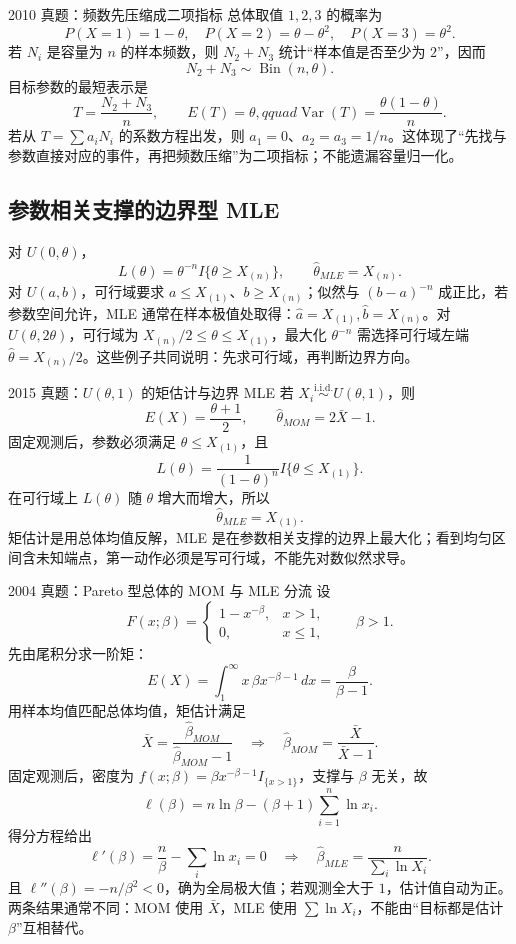 \documentclass[11pt,a4paper]{ctexart}
\begin{document}
\begin{examplebox}{2010 真题：频数先压缩成二项指标}
总体取值 $1,2,3$ 的概率为
\[
P(X=1)=1-\theta,\quad P(X=2)=\theta-\theta^2,\quad P(X=3)=\theta^2.
\]
若 $N_i$ 是容量为 $n$ 的样本频数，则 $N_2+N_3$ 统计“样本值是否至少为 $2$”，因而
\[
N_2+N_3\sim\operatorname{Bin}(n,\theta).
\]
目标参数的最短表示是
\[
T=\frac{N_2+N_3}{n},\qquad E(T)=\theta,qquad
\operatorname{Var}(T)=\frac{\theta(1-\theta)}n.
\]
若从 $T=\sum a_iN_i$ 的系数方程出发，则 $a_1=0$、$a_2=a_3=1/n$。这体现了“先找与参数直接对应的事件，再把频数压缩”为二项指标；不能遗漏容量归一化。
\end{examplebox}

\subsection{参数相关支撑的边界型 MLE}

对 $U(0,\theta)$，
\[
L(\theta)=\theta^{-n}I\{\theta\ge X_{(n)}\},\qquad \widehat\theta_{MLE}=X_{(n)}.
\]
对 $U(a,b)$，可行域要求 $a\le X_{(1)}$、$b\ge X_{(n)}$；似然与 $(b-a)^{-n}$ 成正比，若参数空间允许，MLE 通常在样本极值处取得：$\widehat a=X_{(1)},\widehat b=X_{(n)}$。对 $U(\theta,2\theta)$，可行域为 $X_{(n)}/2\le\theta\le X_{(1)}$，最大化 $\theta^{-n}$ 需选择可行域左端 $\widehat\theta=X_{(n)}/2$。这些例子共同说明：先求可行域，再判断边界方向。

\begin{examplebox}{2015 真题：$U(\theta,1)$ 的矩估计与边界 MLE}
若 $X_i\overset{\mathrm{i.i.d.}}\sim U(\theta,1)$，则
\[
E(X)=\frac{\theta+1}{2},\qquad \widehat\theta_{MOM}=2\bar X-1.
\]
固定观测后，参数必须满足 $\theta\le X_{(1)}$，且
\[
L(\theta)=\frac{1}{(1-\theta)^n}I\{\theta\le X_{(1)}\}.
\]
在可行域上 $L(\theta)$ 随 $\theta$ 增大而增大，所以
\[
\widehat\theta_{MLE}=X_{(1)}.
\]
矩估计是用总体均值反解，MLE 是在参数相关支撑的边界上最大化；看到均匀区间含未知端点，第一动作必须是写可行域，不能先对数似然求导。
\end{examplebox}

\begin{examplebox}{2004 真题：Pareto 型总体的 MOM 与 MLE 分流}
设
\[
F(x;\beta)=\begin{cases}1-x^{-\beta},&x>1,\\0,&x\le1,\end{cases}
\qquad \beta>1.
\]
先由尾积分求一阶矩：
\[
E(X)=\int_1^\infty x\,\beta x^{-\beta-1}\,dx
=\frac{\beta}{\beta-1}.
\]
用样本均值匹配总体均值，矩估计满足
\[
\bar X=\frac{\widehat\beta_{MOM}}{\widehat\beta_{MOM}-1}
\quad\Longrightarrow\quad
\widehat\beta_{MOM}=\frac{\bar X}{\bar X-1}.
\]
固定观测后，密度为 $f(x;\beta)=\beta x^{-\beta-1}I_{\{x>1\}}$，支撑与 $\beta$ 无关，故
\[
\ell(\beta)=n\ln\beta-(\beta+1)\sum_{i=1}^n\ln x_i.
\]
得分方程给出
\[
\ell'(\beta)=\frac n\beta-\sum_i\ln x_i=0
\quad\Longrightarrow\quad
\widehat\beta_{MLE}=\frac n{\sum_i\ln X_i}.
\]
且 $\ell''(\beta)=-n/\beta^2<0$，确为全局极大值；若观测全大于 $1$，估计值自动为正。两条结果通常不同：MOM 使用 $\bar X$，MLE 使用 $\sum\ln X_i$，不能由“目标都是估计 $\beta$”互相替代。
\end{examplebox}
\end{document}
